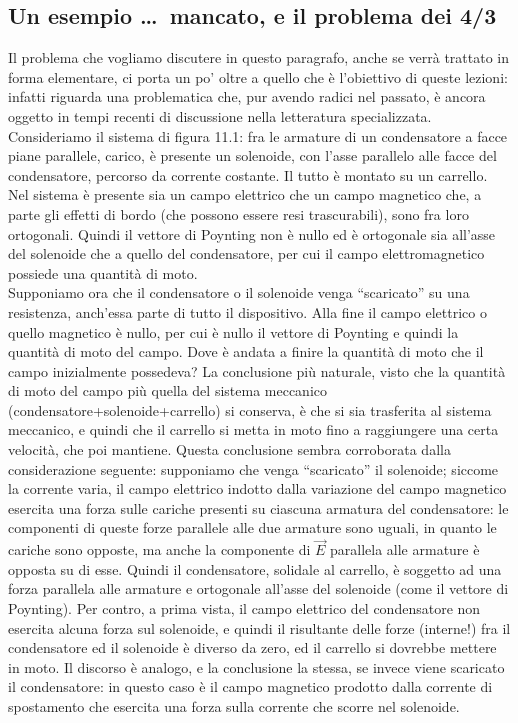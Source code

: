 \subsection{Un esempio \dots\ mancato, e il problema dei 4/3}

Il problema che vogliamo discutere in questo paragrafo, anche se verr\`a
trattato in forma elementare, ci porta un po' oltre a quello che \`e l'obiettivo
di queste lezioni: infatti riguarda una problematica che, pur avendo radici nel
passato, \`e ancora oggetto in tempi recenti di discussione nella letteratura
specializzata.\\
Consideriamo il sistema di figura 11.1: fra le armature di un condensatore a
facce piane parallele, carico, \`e presente un solenoide, con l'asse parallelo
alle facce del condensatore, percorso da corrente costante. Il tutto \`e montato
su un carrello.
Nel sistema \`e presente sia un campo elettrico che un campo magnetico che, a
parte gli effetti di bordo (che possono essere resi trascurabili), sono fra loro
ortogonali. Quindi il vettore di Poynting non \`e nullo ed \`e ortogonale sia
all'asse del solenoide che a quello del condensatore, per cui il campo
elettromagnetico possiede una quantit\`a di moto.\\
Supponiamo ora che il condensatore o il solenoide venga ``scaricato'' su una
resistenza, anch'essa parte di tutto il dispositivo. Alla fine il campo
elettrico o quello magnetico \`e nullo, per cui \`e nullo il vettore di Poynting
e quindi la quantit\`a di moto del campo. Dove \`e andata a finire la quantit\`a
di moto che il campo inizialmente possedeva? La conclusione pi\`u naturale,
visto che la quantit\`a di moto del campo pi\`u quella del sistema meccanico
(condensatore+solenoide+carrello) si conserva, \`e che si sia trasferita al
sistema meccanico, e quindi che il carrello si metta in moto fino a raggiungere
una certa velocit\`a, che poi mantiene. Questa conclusione sembra corroborata
dalla considerazione seguente: supponiamo che venga ``scaricato'' il solenoide;
siccome la corrente varia, il campo elettrico indotto dalla variazione del campo
magnetico esercita una forza sulle cariche presenti su ciascuna armatura del
condensatore: le componenti di queste forze parallele alle due armature sono
uguali, in quanto le cariche sono opposte, ma anche la componente di $\vec E$
parallela alle armature \`e opposta su di esse. Quindi il condensatore, solidale
al carrello, \`e soggetto ad una forza parallela alle armature e ortogonale
all'asse del solenoide (come il vettore di Poynting). Per contro, a prima vista,
il campo elettrico del condensatore non esercita alcuna forza sul solenoide, e
quindi il risultante delle forze (interne!) fra il condensatore ed il solenoide
\`e diverso da zero, ed il carrello si dovrebbe mettere in moto. Il discorso \`e
analogo, e la conclusione la stessa, se invece viene scaricato il condensatore:
in questo caso \`e il campo magnetico prodotto dalla corrente di spostamento che
esercita una forza sulla corrente che scorre nel solenoide.

